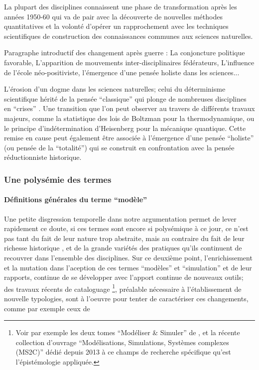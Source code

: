 La plupart des disciplines connaissent une phase de transformation après les années 1950-60 qui va de pair avec la découverte de nouvelles méthodes quantitatives et la volonté d'opérer un rapprochement avec les techniques scientifiques de construction des connaissances communes aux sciences naturelles.

Paragraphe introductif des changement après guerre : La conjoncture politique favorable, L'apparition de mouvements inter-disciplinaires fédérateurs, L'influence de l'école néo-positiviste, l'émergence d'une pensée holiste dans les sciences...

L'érosion d'un dogme dans les sciences naturelles; celui du déterminisme scientifique hérité de la pensée \enquote{classique} qui plonge de nombreuses disciplines en \enquote{crises} \autocite[20-23]{Pouvreau2013}. Une transition que l'on peut observer au travers de différents travaux majeurs, comme la statistique des lois de Boltzman pour la thermodynamique, ou le principe d’indétermination d'Heisenberg pour la mécanique quantique. Cette remise en cause peut également être associée à l'émergence d'une pensée \enquote{holiste} (ou pensée de la \enquote{totalité}) qui se construit en confrontation avec la pensée réductionniste historique.


\subsubsection{Une polysémie des termes}

\paragraph{Définitions générales du terme \enquote{modèle}}

Une petite disgression temporelle dans notre argumentation permet de lever rapidement ce doute, si ces termes sont encore si polysémique à ce jour, ce n'est pas tant du fait de leur nature trop abstraite, mais au contraire du fait de leur richesse historique \textcite[131]{Varenne2012}, et de la grande variétés des pratiques qu'ils continuent de recouvrer dans l'ensemble des disciplines. Sur ce deuxième point, l'enrichissement et la mutation dans l'aception de ces termes \enquote{modèles} et \enquote{simulation} et de leur rapports, continue de se développer avec l'apport continue de nouveaux outils; des travaux récents de cataloguage \footnote{Voir par exemple les deux tomes \enquote{Modéliser \& Simuler} de \textcite{Varenne2013}, et la récente collection d'ouvrage \enquote{Modélisations, Simulations, Systèmes complexes (MS2C)} dédié depuis 2013 à ce champs de recherche spécifique qu'est l'épistémologie appliquée.}, préalable nécessaire à l'établissement de nouvelle typologies, sont à l'oeuvre pour tenter de caractériser ces changements, comme par exemple ceux de \textcite{Varenne2013}

